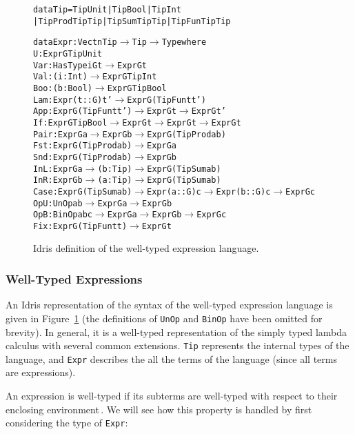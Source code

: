 \begin{figure}
\begin{alltt}
  data Tip = TipUnit | TipBool | TipInt 
           | TipProd Tip Tip | TipSum Tip Tip | TipFun Tip Tip

  data Expr : Vect n Tip \(\rightarrow\) Tip \(\rightarrow\) Type where
    U    : Expr G TipUnit
    Var  : HasType i G t \(\rightarrow\) Expr G t
    Val  : (i : Int) \(\rightarrow\) Expr G TipInt
    Boo  : (b : Bool) \(\rightarrow\) Expr G TipBool
    Lam  : Expr (t :: G) t' \(\rightarrow\) Expr G (TipFun t t')
    App  : Expr G (TipFun t t') \(\rightarrow\) Expr G t \(\rightarrow\) Expr G t'
    If   : Expr G TipBool \(\rightarrow\) Expr G t \(\rightarrow\) Expr G t \(\rightarrow\) Expr G t
    Pair : Expr G a \(\rightarrow\) Expr G b \(\rightarrow\) Expr G (TipProd a b)
    Fst  : Expr G (TipProd a b) \(\rightarrow\) Expr G a
    Snd  : Expr G (TipProd a b) \(\rightarrow\) Expr G b
    InL  : Expr G a \(\rightarrow\) (b: Tip) \(\rightarrow\) Expr G (TipSum a b)
    InR  : Expr G b \(\rightarrow\) (a: Tip) \(\rightarrow\) Expr G (TipSum a b)
    Case : Expr G (TipSum a b) \(\rightarrow\) Expr (a :: G) c \(\rightarrow\) Expr (b :: G) c \(\rightarrow\) Expr G c
    OpU  : UnOp a b \(\rightarrow\) Expr G a \(\rightarrow\) Expr G b
    OpB  : BinOp a b c \(\rightarrow\) Expr G a \(\rightarrow\) Expr G b \(\rightarrow\) Expr G c
    Fix  : Expr G (TipFun t t) \(\rightarrow\) Expr G t
\end{alltt}
\caption{Idris definition of the well-typed expression language.}
\label{fig:idris-def-expr-lang}
\end{figure}


\subsubsection{Well-Typed Expressions}
An Idris representation of the syntax of the well-typed expression language is given in Figure~\ref{fig:idris-def-expr-lang} (the definitions of \texttt{UnOp} and \texttt{BinOp} have been omitted for brevity). In general, it is a well-typed representation of the simply typed lambda calculus with several common extensions. \texttt{Tip} represents the internal types of the language, and \texttt{Expr} describes the all the terms of the language (since all terms are expressions).

An expression is well-typed if its subterms are well-typed with respect to their enclosing environment\,\cite{Milner78atheory}. We will see how this property is handled by first considering the type of \texttt{Expr}:

